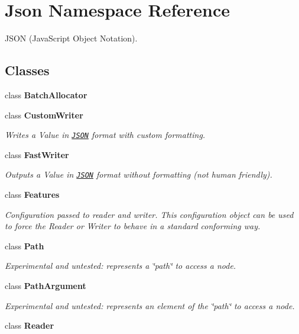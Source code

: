\hypertarget{namespace_json}{}\section{Json Namespace Reference}
\label{namespace_json}


J\+S\+ON (Java\+Script Object Notation).  


\subsection*{Classes}
\begin{DoxyCompactItemize}
\item 
class {\bfseries Batch\+Allocator}
\item 
class {\bfseries Custom\+Writer}
\begin{DoxyCompactList}\small\item\em Writes a Value in \href{http://www.json.org}{\tt J\+S\+ON} format with custom formatting. \end{DoxyCompactList}\item 
class {\bfseries Fast\+Writer}
\begin{DoxyCompactList}\small\item\em Outputs a Value in \href{http://www.json.org}{\tt J\+S\+ON} format without formatting (not human friendly). \end{DoxyCompactList}\item 
class {\bfseries Features}
\begin{DoxyCompactList}\small\item\em Configuration passed to reader and writer. This configuration object can be used to force the Reader or Writer to behave in a standard conforming way. \end{DoxyCompactList}\item 
class {\bfseries Path}
\begin{DoxyCompactList}\small\item\em Experimental and untested\+: represents a \char`\"{}path\char`\"{} to access a node. \end{DoxyCompactList}\item 
class {\bfseries Path\+Argument}
\begin{DoxyCompactList}\small\item\em Experimental and untested\+: represents an element of the \char`\"{}path\char`\"{} to access a node. \end{DoxyCompactList}\item 
class {\bfseries Reader}

\end{DoxyCompactItemize}

